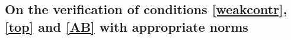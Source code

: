\documentclass[11pt,reqno,a4paper]{article}
\theoremstyle{special}
\def\om{\omega}
\begin{document}





\subsection{On the verification of conditions \eqref{weakcontr}, \eqref{top} and \eqref{AB} with appropriate norms}
\end{document}
